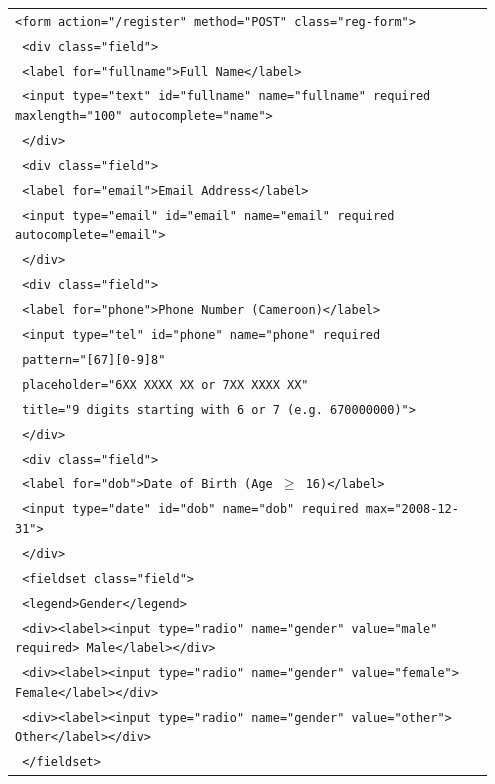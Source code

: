 \documentclass[11pt]{article}
\begin{document}
\begin{exoresolu}
\begin{center}
\begin{tabular}{|p{0.95\linewidth}|}\hline
\texttt{<form action="/register" method="POST" class="reg-form">}\\
\texttt{  <div class="field">}\\
\texttt{    <label for="fullname">Full Name</label>}\\
\texttt{    <input type="text" id="fullname" name="fullname" required maxlength="100" autocomplete="name">}\\
\texttt{  </div>}\\
\texttt{  <div class="field">}\\
\texttt{    <label for="email">Email Address</label>}\\
\texttt{    <input type="email" id="email" name="email" required autocomplete="email">}\\
\texttt{  </div>}\\
\texttt{  <div class="field">}\\
\texttt{    <label for="phone">Phone Number (Cameroon)</label>}\\
\texttt{    <input type="tel" id="phone" name="phone" required}\\
\texttt{           pattern="[67][0-9]{8}"}\\
\texttt{           placeholder="6XX XXXX XX or 7XX XXXX XX"}\\
\texttt{           title="9 digits starting with 6 or 7 (e.g. 670000000)">}\\
\texttt{  </div>}\\
\texttt{  <div class="field">}\\
\texttt{    <label for="dob">Date of Birth (Age $\ge$ 16)</label>}\\
\texttt{    <input type="date" id="dob" name="dob" required max="2008-12-31">}\\
\texttt{  </div>}\\
\texttt{  <fieldset class="field">}\\
\texttt{    <legend>Gender</legend>}\\
\texttt{    <div><label><input type="radio" name="gender" value="male" required> Male</label></div>}\\
\texttt{    <div><label><input type="radio" name="gender" value="female"> Female</label></div>}\\
\texttt{    <div><label><input type="radio" name="gender" value="other"> Other</label></div>}\\
\texttt{  </fieldset>}\\

\end{tabular}
\end{center}
\end{exoresolu}
\end{document}
